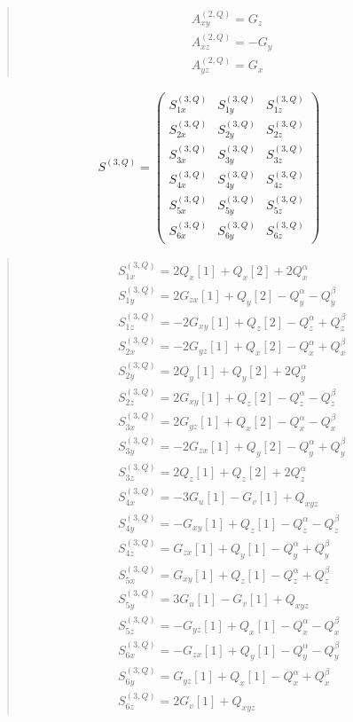 \documentclass[fleqn,10pt]{jsarticle}
\begin{document}
\begin{quote}
\begin{align*}
& A^{(2,Q)}_{xy} = G_{z} \\
& A^{(2,Q)}_{xz} = - G_{y} \\
& A^{(2,Q)}_{yz} = G_{x}
\end{align*}
\end{quote}
\begin{align*}
S^{(3,Q)} = \begin{pmatrix} S^{(3,Q)}_{1x} & S^{(3,Q)}_{1y} & S^{(3,Q)}_{1z} \\ S^{(3,Q)}_{2x} & S^{(3,Q)}_{2y} & S^{(3,Q)}_{2z} \\ S^{(3,Q)}_{3x} & S^{(3,Q)}_{3y} & S^{(3,Q)}_{3z} \\ S^{(3,Q)}_{4x} & S^{(3,Q)}_{4y} & S^{(3,Q)}_{4z} \\ S^{(3,Q)}_{5x} & S^{(3,Q)}_{5y} & S^{(3,Q)}_{5z} \\ S^{(3,Q)}_{6x} & S^{(3,Q)}_{6y} & S^{(3,Q)}_{6z} \end{pmatrix}
\end{align*}
\begin{quote}
\begin{align*}
& S^{(3,Q)}_{1x} = 2 Q_{x}[1] + Q_{x}[2] + 2 Q_{x}^{\alpha} \\
& S^{(3,Q)}_{1y} = 2 G_{zx}[1] + Q_{y}[2] - Q_{y}^{\alpha} - Q_{y}^{\beta} \\
& S^{(3,Q)}_{1z} = - 2 G_{xy}[1] + Q_{z}[2] - Q_{z}^{\alpha} + Q_{z}^{\beta} \\
& S^{(3,Q)}_{2x} = - 2 G_{yz}[1] + Q_{x}[2] - Q_{x}^{\alpha} + Q_{x}^{\beta} \\
& S^{(3,Q)}_{2y} = 2 Q_{y}[1] + Q_{y}[2] + 2 Q_{y}^{\alpha} \\
& S^{(3,Q)}_{2z} = 2 G_{xy}[1] + Q_{z}[2] - Q_{z}^{\alpha} - Q_{z}^{\beta} \\
& S^{(3,Q)}_{3x} = 2 G_{yz}[1] + Q_{x}[2] - Q_{x}^{\alpha} - Q_{x}^{\beta} \\
& S^{(3,Q)}_{3y} = - 2 G_{zx}[1] + Q_{y}[2] - Q_{y}^{\alpha} + Q_{y}^{\beta} \\
& S^{(3,Q)}_{3z} = 2 Q_{z}[1] + Q_{z}[2] + 2 Q_{z}^{\alpha} \\
& S^{(3,Q)}_{4x} = - 3 G_{u}[1] - G_{v}[1] + Q_{xyz} \\
& S^{(3,Q)}_{4y} = - G_{xy}[1] + Q_{z}[1] - Q_{z}^{\alpha} - Q_{z}^{\beta} \\
& S^{(3,Q)}_{4z} = G_{zx}[1] + Q_{y}[1] - Q_{y}^{\alpha} + Q_{y}^{\beta} \\
& S^{(3,Q)}_{5x} = G_{xy}[1] + Q_{z}[1] - Q_{z}^{\alpha} + Q_{z}^{\beta} \\
& S^{(3,Q)}_{5y} = 3 G_{u}[1] - G_{v}[1] + Q_{xyz} \\
& S^{(3,Q)}_{5z} = - G_{yz}[1] + Q_{x}[1] - Q_{x}^{\alpha} - Q_{x}^{\beta} \\
& S^{(3,Q)}_{6x} = - G_{zx}[1] + Q_{y}[1] - Q_{y}^{\alpha} - Q_{y}^{\beta} \\
& S^{(3,Q)}_{6y} = G_{yz}[1] + Q_{x}[1] - Q_{x}^{\alpha} + Q_{x}^{\beta} \\
& S^{(3,Q)}_{6z} = 2 G_{v}[1] + Q_{xyz}
\end{align*}
\end{quote}
\end{document}
